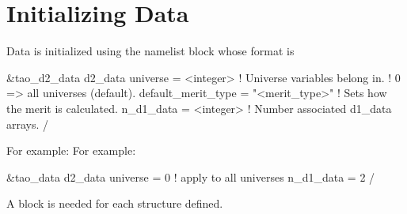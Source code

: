 {{{{{{{{{{{{{{{{%
\section{Initializing Data}
\label{s:init_data} 

Data is initialized using the  namelist block whose format is
\begin{example}
  \&tao_d2_data
    d2_data%
    universe     = <integer>      ! Universe variables belong in.
                                        !   0 => all universes (default).
    default_merit_type = "<merit_type>" ! Sets how the merit is calculated.
    n_d1_data          = <integer>      ! Number associated d1_data arrays.
  /
\end{example}
For example:
For example:
\begin{example}
  \&tao_data
    d2_data%
    universe     = 0  ! apply to all universes
    n_d1_data    = 2
  /
\end{example}
A  block is needed for each  structure
defined. \vn{d2_data%
\vn{universe} gives the universe that the data is associated with. A
value of zero means that a \vn{d2_data} structure is set up in each
universe. \vn{default_merit_type} determines how the merit function
terms are calculated for the individual datum points. Possibilities
are:
\begin{example}
  target
  max
  min
  abs_max
  abs_min
\end{example}
See the chapter on optimization for more details.  

}}}}}}}}}}}}}}}}}
